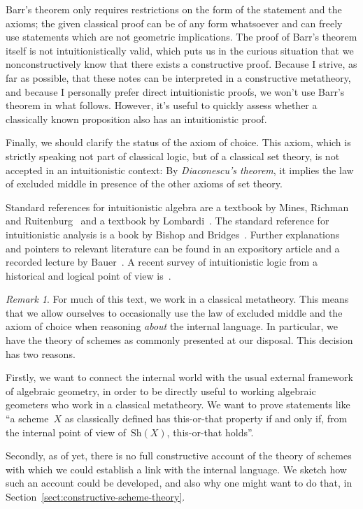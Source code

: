 \documentclass[10pt,reqno,a4paper]{amsbook}
\theoremstyle{definition}
\theoremstyle{plain}
\theoremstyle{remark}
\newtheorem{rem}[defn]{Remark}
\newcommand{\Sh}{\mathrm{Sh}}
\newcommand{\?}{\,{:}\,}
\renewcommand{\_}{\mathpunct{.}\,}
\begin{document}
Barr's theorem only requires restrictions on the form of the statement and the
axioms; the given classical proof can be of any form whatsoever and can freely
use statements which are not geometric implications. The proof of Barr's
theorem itself is not intuitionistically valid, which puts us in the curious
situation that we nonconstructively know that there exists a constructive
proof. Because I strive, as far as possible, that these notes can be
interpreted in a constructive metatheory, and because I personally prefer
direct intuitionistic proofs, we won't use Barr's theorem in what follows.
However, it's useful to quickly assess whether a classically known proposition
also has an intuitionistic proof.

Finally, we should clarify the status of the axiom of choice. This axiom, which
is strictly speaking not part of classical logic, but of a classical set
theory, is not accepted in an intuitionistic context: By \emph{Diaconescu's
theorem}, it implies the law of excluded middle in presence of the other axioms
of set theory.

Standard references for intuitionistic algebra are a textbook by Mines,
Richman and
Ruitenburg~\cite{mines-richman-ruitenburg:constructive-algebra} and a textbook
by Lombardi~\cite{lombardi:quitte:constructive-algebra}. The standard
reference for intuitionistic analysis is a book by Bishop and
Bridges~\cite{bishop-bridges:constructive-analysis}. Further explanations and
pointers to relevant literature can be found in an expository article and a
recorded lecture by Bauer~\cite{bauer:int-mathematics,bauer:video}. A
recent survey of intuitionistic logic from a historical and logical point of
view is~\cite{melikhov:intuitionistic-logic}.

\begin{rem}For much of this text, we work in a classical metatheory. This
means that we allow ourselves to occasionally use the law of excluded middle
and the axiom of choice when reasoning \emph{about} the internal language.
In particular, we have the theory of schemes as commonly presented at our
disposal. This decision has two reasons.

Firstly, we want to connect the internal world with the usual external
framework of algebraic geometry, in order to be directly useful to working
algebraic geometers who work in a classical metatheory. We want to prove
statements like ``a scheme~$X$ as classically defined has this-or-that property
if and only if, from the internal point of view of~$\Sh(X)$, this-or-that
holds''.

Secondly, as of yet, there is no full constructive account of the theory of
schemes with which we could establish a link with the internal language. We
sketch how such an account could be developed, and also why one might want to
do that, in Section~\ref{sect:constructive-scheme-theory}.\end{rem}
\end{document}
